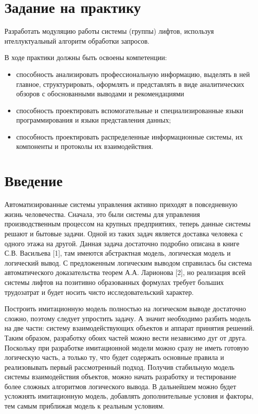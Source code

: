 \section{Задание на практику}
	Разработать модуляцию работы системы (группы) лифтов, используя нтеллуктуальный алгоритм обработки запросов.

	В ходе практики должны быть освоены компетенции:
		\begin{itemize}
			\item способность анализировать профессиональную информацию, выделять в ней главное, структурировать, оформлять и представлять в виде аналитических обзоров с обоснованными выводами и рекомендациями
			\item способность проектировать вспомогательные и специализированные языки программирования и языки представления данных;
			\item способность проектировать распределенные информационные системы, их компоненты и протоколы их взаимодействия.
		\end{itemize}


\newpage
\section{Введение}
Автоматизированные системы управления активно приходят в повседневную жизнь человечества. Сначала, это были системы для управления производственным процессом на крупных предприятиях, теперь данные системы решают и бытовые задачи. Одной из таких задач является доставка человека с одного этажа на другой. Данная задача достаточно подробно описана в книге С.В. Васильева [1], там имеются абстрактная модель, логическая модель и логический вывод. С предложенным логическим выводом справилась бы система автоматического доказательства теорем А.А. Ларионова [2], но реализация всей системы лифтов на позитивно образованных формулах требует больших трудозатрат и будет носить чисто исследовательский характер.

Построить имитационную модель полностью на логическом выводе достаточно сложно, поэтому следует упростить задачу. А значит необходимо разбить модель на две части: систему взаимодействующих объектов и аппарат принятия решений. Таким образом, разработку обоих частей можно вести независимо дуг от друга. Поскольку при разработке имитационной модели можно сразу не иметь готовую логическую часть, а только ту, что будет содержать основные правила и реализовывать первый рассмотренный подход. Получив стабильную модель системы взаимодействия объектов, можно начать разработку и тестирование более сложных алгоритмов логического вывода. В дальнейшем можно будет усложнять имитационную модель, добавлять дополнительные условия и факторы, тем самым приближая модель к реальным условиям.
